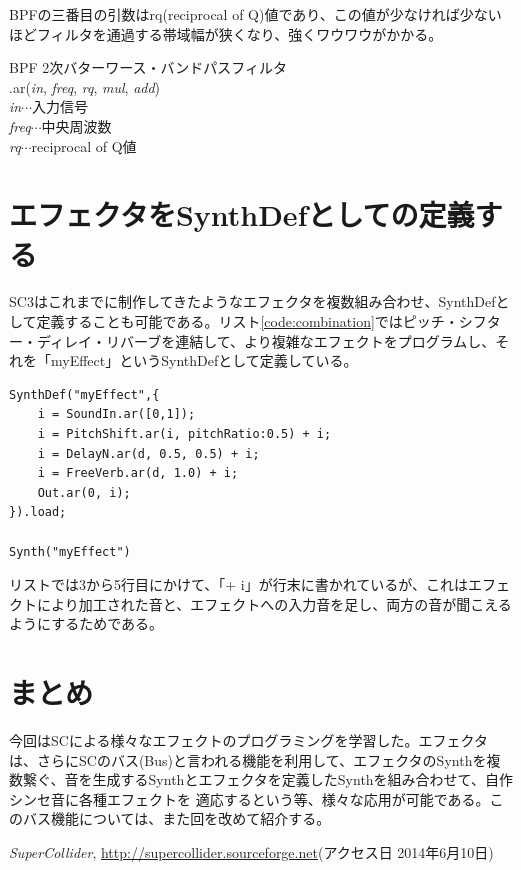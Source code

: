 \documentclass{jsarticle}
\begin{document}
BPFの三番目の引数はrq(reciprocal of Q)値であり、この値が少なければ少ないほどフィルタを通過する帯域幅が狭くなり、強くワウワウがかかる。

\begin{itembox}[l]{BPF}
{\footnotesize 
2次バターワース・バンドパスフィルタ\\
.ar({\it in}, {\it freq}, {\it rq}, {\it mul}, {\it add})\\

{\it in}$\cdots$入力信号\\
{\it freq}$\cdots$中央周波数\\
{\it rq}$\cdots$reciprocal of Q値\\
}
\end{itembox}

\section{エフェクタをSynthDefとしての定義する}
SC3はこれまでに制作してきたようなエフェクタを複数組み合わせ、SynthDefとして定義することも可能である。リスト\ref{code:combination}ではピッチ・シフター・ディレイ・リバーブを連結して、より複雑なエフェクトをプログラムし、それを「myEffect」というSynthDefとして定義している。

\begin{lstlisting}[caption=エフェクトの組み合わせ, label=code:combination]
SynthDef("myEffect",{
	i = SoundIn.ar([0,1]);
	i = PitchShift.ar(i, pitchRatio:0.5) + i;
	i = DelayN.ar(d, 0.5, 0.5) + i;
	i = FreeVerb.ar(d, 1.0) + i;
	Out.ar(0, i);
}).load;

Synth("myEffect")
\end{lstlisting}

リストでは3から5行目にかけて、「+ i」が行末に書かれているが、これはエフェクトにより加工された音と、エフェクトへの入力音を足し、両方の音が聞こえるようにするためである。

\section{まとめ}
今回はSCによる様々なエフェクトのプログラミングを学習した。エフェクタは、さらにSCのバス(Bus)と言われる機能を利用して、エフェクタのSynthを複数繋ぐ、音を生成するSynthとエフェクタを定義したSynthを組み合わせて、自作シンセ音に各種エフェクトを
適応するという等、様々な応用が可能である。このバス機能については、また回を改めて紹介する。


\begin{thebibliography}{citations}
   {\it SuperCollider}, \url{http://supercollider.sourceforge.net}(アクセス日 2014年6月10日)
\end{thebibliography}
\end{document}
